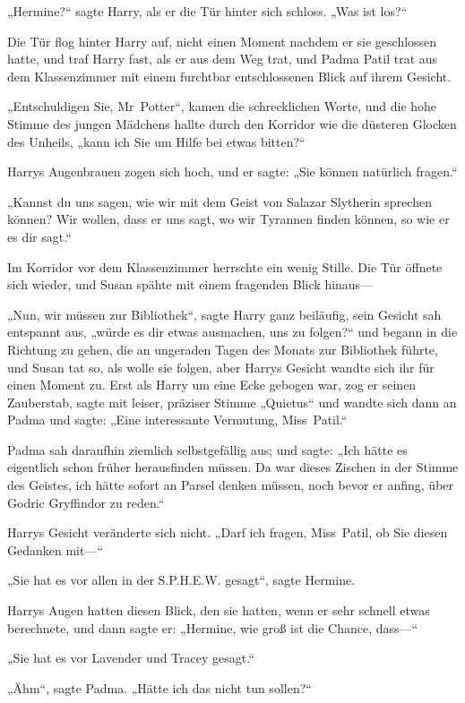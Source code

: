 {„Hermine?“ sagte Harry, als er die Tür hinter sich schloss. „Was ist los?“

Die Tür flog hinter Harry auf, nicht einen Moment nachdem er sie geschlossen hatte, und traf Harry fast, als er aus dem Weg trat, und Padma Patil trat aus dem Klassenzimmer mit einem furchtbar entschlossenen Blick auf ihrem Gesicht.

„Entschuldigen Sie, Mr~Potter“, kamen die schrecklichen Worte, und die hohe Stimme des jungen Mädchens hallte durch den Korridor wie die düsteren Glocken des Unheils, „kann ich Sie um Hilfe bei etwas bitten?“

Harrys Augenbrauen zogen sich hoch, und er sagte: „Sie können natürlich fragen.“

„Kannst du uns sagen, wie wir mit dem Geist von Salazar Slytherin sprechen können? Wir wollen, dass er uns sagt, wo wir Tyrannen finden können, so wie er es dir sagt.“

Im Korridor vor dem Klassenzimmer herrschte ein wenig Stille. Die Tür öffnete sich wieder, und Susan spähte mit einem fragenden Blick hinaus—

„Nun, wir müssen zur Bibliothek“, sagte Harry ganz beiläufig, sein Gesicht sah entspannt aus, „würde es dir etwas ausmachen, uns zu folgen?“ und begann in die Richtung zu gehen, die an ungeraden Tagen des Monats zur Bibliothek führte, und Susan tat so, als wolle sie folgen, aber Harrys Gesicht wandte sich ihr für einen Moment zu. Erst als Harry um eine Ecke gebogen war, zog er seinen Zauberstab, sagte mit leiser, präziser Stimme „Quietus“ und wandte sich dann an Padma und sagte: „Eine interessante Vermutung, Miss~Patil.“

Padma sah daraufhin ziemlich selbstgefällig aus; und sagte: „Ich hätte es eigentlich schon früher herausfinden müssen. Da war dieses Zischen in der Stimme des Geistes, ich hätte sofort an Parsel denken müssen, noch bevor er anfing, über Godric Gryffindor zu reden.“

Harrys Gesicht veränderte sich nicht. „Darf ich fragen, Miss~Patil, ob Sie diesen Gedanken mit—“

„Sie hat es vor allen in der S.P.H.E.W. gesagt“, sagte Hermine.

Harrys Augen hatten diesen Blick, den sie hatten, wenn er sehr schnell etwas berechnete, und dann sagte er: „Hermine, wie groß ist die Chance, dass—“

„Sie hat es vor Lavender und Tracey gesagt.“

„Ähm“, sagte Padma. „Hätte ich das nicht tun sollen?“

}

